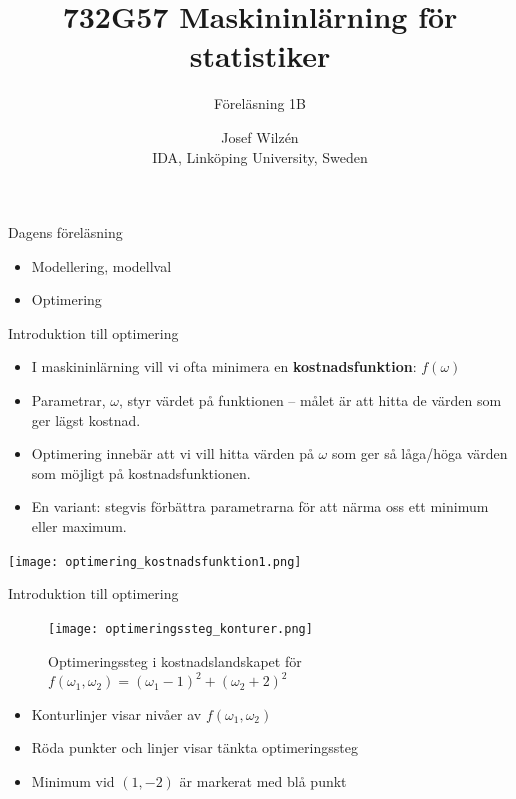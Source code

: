 \documentclass[10pt,english]{beamer}
\title{732G57 Maskininlärning för statistiker}
\subtitle{Föreläsning 1B}
\date{}
\author{Josef Wilzén \\ IDA, Linköping University, Sweden}
\begin{document}
\maketitle

\begin{frame}{Dagens föreläsning}
    \begin{itemize}
        \item Modellering, modellval
        \item Optimering 
    \end{itemize}
\end{frame}

\begin{frame}{Introduktion till optimering}
  \begin{itemize}
    \item I maskininlärning vill vi ofta minimera en \textbf{kostnadsfunktion}: $f\left(\omega\right)$
    \item Parametrar, $\omega$, styr värdet på funktionen  – målet är att hitta de värden som ger lägst kostnad.
    \item Optimering innebär att vi vill hitta värden på $\omega$ som ger så låga/höga värden som möjligt på kostnadsfunktionen.
    \item En variant: stegvis förbättra parametrarna för att närma oss ett minimum eller maximum.
  \end{itemize}

  \vspace{1em}
  \begin{center}
    \texttt{[image: optimering\_kostnadsfunktion1.png]}
  \end{center}
\end{frame}

\begin{frame}{Introduktion till optimering}
    \begin{figure}[htbp]
        \centering
        \texttt{[image: optimeringssteg\_konturer.png]}
        \caption*{Optimeringssteg i kostnadslandskapet för 
        $f(\omega_1, \omega_2) = (\omega_1 - 1)^2 + (\omega_2 + 2)^2$}
    \end{figure}
    \begin{itemize}
        \item Konturlinjer visar nivåer av $f(\omega_1, \omega_2)$
        \item Röda punkter och linjer visar tänkta optimeringssteg
        \item Minimum vid $(1, -2)$ är markerat med blå punkt
    \end{itemize}
\end{frame}
\end{document}
